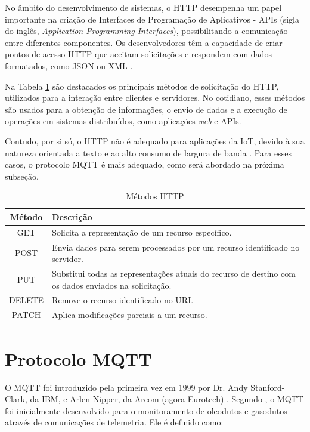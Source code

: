 No âmbito do desenvolvimento de sistemas, o HTTP desempenha um papel importante na criação de Interfaces de Programação de Aplicativos - APIs (sigla do inglês, \textit{Application Programming Interfaces}), possibilitando a comunicação entre diferentes componentes. Os desenvolvedores têm a capacidade de criar pontos de acesso HTTP que aceitam solicitações e respondem com dados formatados, como JSON ou XML \parencite{Newmann_web}.

Na Tabela \ref{tab:metodos_http} são destacados os principais métodos de solicitação do HTTP, utilizados para a interação entre clientes e servidores. No cotidiano, esses métodos são usados para a obtenção de informações, o envio de dados e a execução de operações em sistemas distribuídos, como aplicações \textit{web} e APIs.

Contudo, por si só, o HTTP não é adequado para aplicações da IoT, devido à sua natureza orientada a texto e ao alto consumo de largura de banda \parencite{Yassein_mqtt2017}. Para esses casos, o protocolo MQTT é mais adequado, como será abordado na próxima subseção.

\begin{table}[!htb]
  \caption{Métodos HTTP} \label{tab:metodos_http}
  \begin{tabularx}{\textwidth}{|c|X|} \hline
    \textbf{Método} & \textbf{Descrição} \\ \hline
    GET & Solicita a representação de um recurso específico. \\ \hline
    POST & Envia dados para serem processados por um recurso identificado no servidor. \\ \hline
    PUT & Substitui todas as representações atuais do recurso de destino com os dados enviados na solicitação. \\ \hline
    DELETE & Remove o recurso identificado no URI. \\ \hline
    PATCH & Aplica modificações parciais a um recurso. \\ \hline  
  \end{tabularx}
\end{table}

\section{Protocolo MQTT}

O MQTT foi introduzido pela primeira vez em 1999 por Dr. Andy Stanford-Clark, da IBM, e Arlen Nipper, da Arcom (agora Eurotech) \parencite{Yassein_mqtt2017}. Segundo \textcite{Andy_mqtt2004}, o MQTT foi inicialmente desenvolvido para o monitoramento de oleodutos e gasodutos através de comunicações de telemetria. Ele é definido como:

